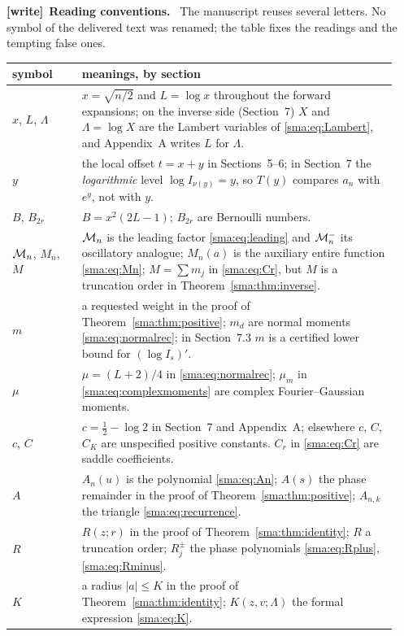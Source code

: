 \documentclass[11pt,letterpaper]{article}
\numberwithin{equation}{section}
\newenvironment{writenote}[1][]{\par\smallskip\begingroup\small
 \noindent\textbf{[write]}\if\relax\detokenize{#1}\relax\else~\textbf{#1.}\fi\ }%
 {\par\endgroup\smallskip}
\begin{document}
\begin{writenote}[Reading conventions]
The manuscript reuses several letters. No symbol of the delivered text was
renamed; the table fixes the readings and the tempting false ones.

\smallskip
\noindent\begin{tabular}{@{}>{\raggedright\arraybackslash}p{0.17\linewidth}
 >{\raggedright\arraybackslash}p{0.77\linewidth}@{}}
\toprule
symbol & meanings, by section \\
\midrule
$x$, $L$, $\Lambda$ & $x=\sqrt{n/2}$ and $L=\log x$ throughout the forward
 expansions; on the inverse side (Section~7) $X$ and $\Lambda=\log X$ are the
 Lambert variables of \eqref{sma:eq:Lambert}, and Appendix~A writes $L$ for
 $\Lambda$. \\
$y$ & the local offset $t=x+y$ in Sections~5--6; in Section~7 the
 \emph{logarithmic} level $\log I_{\nu(y)}=y$, so $T(y)$ compares $a_n$ with
 $e^y$, not with $y$. \\
$B$, $B_{2r}$ & $B=x^2(2L-1)$; $B_{2r}$ are Bernoulli numbers. \\
$\mathcal M_n$, $M_n$, $M$ & $\mathcal M_n$ is the leading factor \eqref{sma:eq:leading} and
 $\mathcal M_n^-$ its oscillatory analogue; $M_n(a)$ is the auxiliary entire
 function \eqref{sma:eq:Mn}; $M=\sum m_j$ in \eqref{sma:eq:Cr}, but $M$ is a
 truncation order in Theorem~\ref{sma:thm:inverse}. \\
$m$ & a requested weight in the proof of Theorem~\ref{sma:thm:positive};
 $m_d$ are normal moments \eqref{sma:eq:normalrec}; in Section~7.3 $m$ is a
 certified lower bound for $(\log I_s)'$. \\
$\mu$ & $\mu=(L+2)/4$ in \eqref{sma:eq:normalrec}; $\mu_m$ in
 \eqref{sma:eq:complexmoments} are complex Fourier--Gaussian moments. \\
$c$, $C$ & $c=\tfrac12-\log2$ in Section~7 and Appendix~A; elsewhere $c$,
 $C$, $C_K$ are unspecified positive constants. $C_r$ in \eqref{sma:eq:Cr}
 are saddle coefficients. \\
$A$ & $A_n(u)$ is the polynomial \eqref{sma:eq:An}; $A(s)$ the phase
 remainder in the proof of Theorem~\ref{sma:thm:positive}; $A_{n,k}$ the
 triangle \eqref{sma:eq:recurrence}. \\
$R$ & $R(z;r)$ in the proof of Theorem~\ref{sma:thm:identity}; $R$ a
 truncation order; $R_j^\pm$ the phase polynomials \eqref{sma:eq:Rplus},
 \eqref{sma:eq:Rminus}. \\
$K$ & a radius $|a|\le K$ in the proof of Theorem~\ref{sma:thm:identity};
 $K(z,v;\Lambda)$ the formal expression \eqref{sma:eq:K}. \\

\end{tabular}
\end{writenote}
\end{document}

